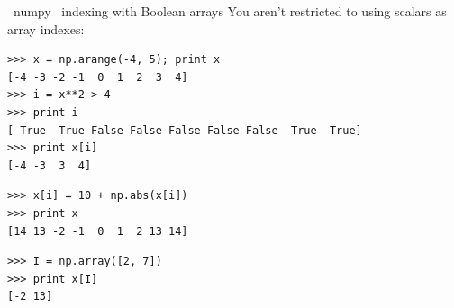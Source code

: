 \documentclass[10pt, t]{beamer}
\let\texttt=\graytt
\let\verb=\codeDelimTwiddles
\begin{document}
\begin{frame}[fragile,label=sec-3-31]{\verb~numpy~ indexing with Boolean arrays}
 You aren't restricted to using scalars as array indexes:
\lstset{language=Python,label= ,caption= ,numbers=none}
\begin{lstlisting}
>>> x = np.arange(-4, 5); print x
[-4 -3 -2 -1  0  1  2  3  4]
>>> i = x**2 > 4
>>> print i
[ True  True False False False False False  True  True]
>>> print x[i]
[-4 -3  3  4]
\end{lstlisting}
\pause
\lstset{language=Python,label= ,caption= ,numbers=none}
\begin{lstlisting}
>>> x[i] = 10 + np.abs(x[i])
>>> print x
[14 13 -2 -1  0  1  2 13 14]
\end{lstlisting}
\pause
\lstset{language=Python,label= ,caption= ,numbers=none}
\begin{lstlisting}
>>> I = np.array([2, 7])
>>> print x[I]
[-2 13]
\end{lstlisting}
\end{frame}



\end{document}
